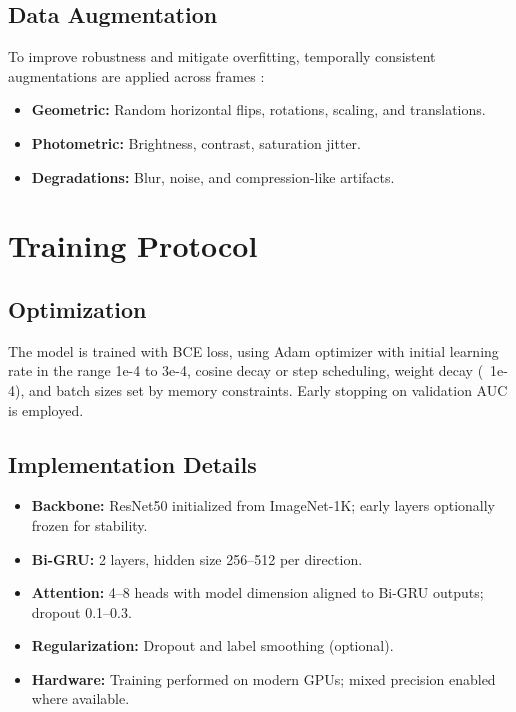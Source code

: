 \subsection{Data Augmentation}
To improve robustness and mitigate overfitting, temporally consistent augmentations are applied across frames \cite{mubarak2023survey}:
\begin{itemize}
    \item \textbf{Geometric:} Random horizontal flips, rotations, scaling, and translations.
    \item \textbf{Photometric:} Brightness, contrast, saturation jitter.
    \item \textbf{Degradations:} Blur, noise, and compression-like artifacts.
\end{itemize}

\section{Training Protocol}
\subsection{Optimization}
The model is trained with BCE loss, using Adam optimizer with initial learning rate in the range 1e-4 to 3e-4, cosine decay or step scheduling, weight decay (~1e-4), and batch sizes set by memory constraints. Early stopping on validation AUC is employed.

\subsection{Implementation Details}
\begin{itemize}
    \item \textbf{Backbone:} ResNet50 initialized from ImageNet-1K; early layers optionally frozen for stability.
    \item \textbf{Bi-GRU:} 2 layers, hidden size 256--512 per direction.
    \item \textbf{Attention:} 4--8 heads with model dimension aligned to Bi-GRU outputs; dropout 0.1--0.3.
    \item \textbf{Regularization:} Dropout and label smoothing (optional).
    \item \textbf{Hardware:} Training performed on modern GPUs; mixed precision enabled where available.
\end{itemize}

